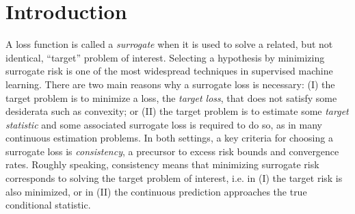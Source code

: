 \documentclass{article} %
\newcommand{\Comments}{0}
\newcommand{\mytodo}[2]{\ifnum\Comments=1%
	\todo[linecolor=#1!80!black,backgroundcolor=#1,bordercolor=#1!80!black]{#2}\fi}
\newcommand{\raft}[1]{\mytodo{green!20!white}{RF: #1}}
\begin{document}
\section{Introduction}\label{sec:intro}
A loss function is called a \emph{surrogate} when it is used to solve a related, but not identical, ``target'' problem of interest.
Selecting a hypothesis by minimizing surrogate risk is one of the most widespread techniques in supervised machine learning.
There are two main reasons why a surrogate loss is necessary: (I) the target problem is to minimize a loss, the \emph{target loss}, that does not satisfy some desiderata such as convexity; or (II) the target problem is to estimate some \emph{target statistic} and some associated surrogate loss is required to do so, as in many continuous estimation problems.
In both settings, a key criteria for choosing a surrogate loss is \emph{consistency}, a precursor to excess risk bounds and convergence rates.
Roughly speaking, consistency means that minimizing surrogate risk corresponds to solving the target problem of interest, i.e. in (I) the target risk is also minimized, or in (II) the continuous prediction approaches the true conditional statistic.
\end{document}
